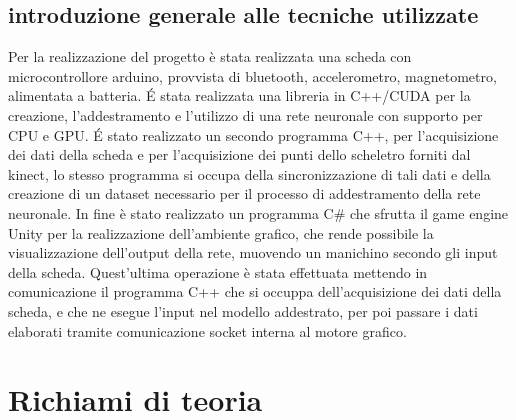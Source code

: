 \documentclass[10pt,a4paper]{article}
\begin{document}
\subsection{introduzione generale alle tecniche utilizzate}
Per la realizzazione del progetto è stata realizzata una scheda con microcontrollore arduino, provvista di bluetooth, accelerometro, magnetometro, alimentata a batteria.
\'E stata realizzata una libreria in C++/CUDA per la creazione, l'addestramento e l'utilizzo di una rete neuronale con supporto per CPU e GPU.
\'E stato realizzato un secondo programma C++, per l'acquisizione dei dati della scheda e per l'acquisizione dei punti dello scheletro forniti dal kinect, lo stesso programma si occupa della sincronizzazione di tali dati e della creazione di un dataset necessario per il processo di addestramento della rete neuronale.
In fine è stato realizzato un programma C\# che sfrutta il game engine Unity per la realizzazione dell'ambiente grafico, che rende possibile la visualizzazione dell'output della rete, muovendo un manichino secondo gli input della scheda.
Quest'ultima operazione è stata effettuata mettendo in comunicazione il programma C++ che si occuppa dell'acquisizione dei dati della scheda, e che ne esegue l'input nel modello addestrato, per poi passare i dati elaborati tramite comunicazione socket interna al motore grafico.       

\section{Richiami di teoria}
\end{document}
